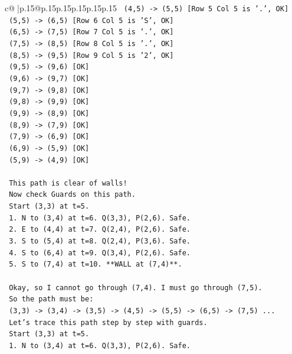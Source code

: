 \documentclass{article}
\begin{document}
{\begin{supertabular}{c@{$\;$}|p{.15\linewidth}@{}p{.15\linewidth}p{.15\linewidth}p{.15\linewidth}p{.15\linewidth}p{.15\linewidth}}
{{{\texttt{  (4,5) {-}> (5,5) {[}Row 5 Col 5 is '.', OK{]}} \\
\texttt{  (5,5) {-}> (6,5) {[}Row 6 Col 5 is 'S', OK{]}} \\
\texttt{  (6,5) {-}> (7,5) {[}Row 7 Col 5 is '.', OK{]}} \\
\texttt{  (7,5) {-}> (8,5) {[}Row 8 Col 5 is '.', OK{]}} \\
\texttt{  (8,5) {-}> (9,5) {[}Row 9 Col 5 is '2', OK{]}} \\
\texttt{  (9,5) {-}> (9,6) {[}OK{]}} \\
\texttt{  (9,6) {-}> (9,7) {[}OK{]}} \\
\texttt{  (9,7) {-}> (9,8) {[}OK{]}} \\
\texttt{  (9,8) {-}> (9,9) {[}OK{]}} \\
\texttt{  (9,9) {-}> (8,9) {[}OK{]}} \\
\texttt{  (8,9) {-}> (7,9) {[}OK{]}} \\
\texttt{  (7,9) {-}> (6,9) {[}OK{]}} \\
\texttt{  (6,9) {-}> (5,9) {[}OK{]}} \\
\texttt{  (5,9) {-}> (4,9) {[}OK{]}} \\
\\ 
\texttt{  This path is clear of walls!} \\
\texttt{  Now check Guards on this path.} \\
\texttt{  Start (3,3) at t=5.} \\
\texttt{  1. N to (3,4) at t=6. Q(3,3), P(2,6). Safe.} \\
\texttt{  2. E to (4,4) at t=7. Q(2,4), P(2,6). Safe.} \\
\texttt{  3. S to (5,4) at t=8. Q(2,4), P(3,6). Safe.} \\
\texttt{  4. S to (6,4) at t=9. Q(3,4), P(2,6). Safe.} \\
\texttt{  5. S to (7,4) at t=10. **WALL at (7,4)**.} \\
\\ 
\texttt{  Okay, so I cannot go through (7,4). I must go through (7,5).} \\
\texttt{  So the path must be:} \\
\texttt{  (3,3) {-}> (3,4) {-}> (3,5) {-}> (4,5) {-}> (5,5) {-}> (6,5) {-}> (7,5) ...} \\
\texttt{  Let's trace this path step by step with guards.} \\
\texttt{  Start (3,3) at t=5.} \\
\texttt{  1. N to (3,4) at t=6. Q(3,3), P(2,6). Safe.} \\
}}}
\end{supertabular}}
\end{document}
